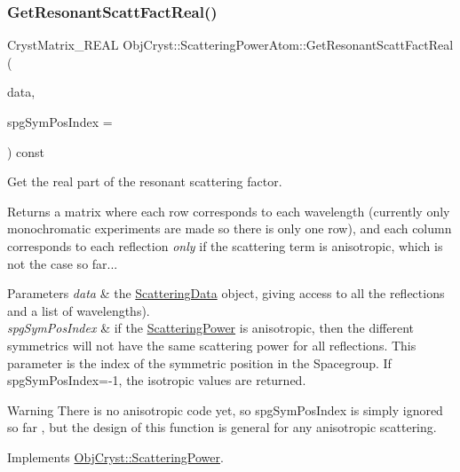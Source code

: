 \subsubsection{\texorpdfstring{GetResonantScattFactReal()}{GetResonantScattFactReal()}}
{\footnotesize\ttfamily Cryst\+Matrix\+\_\+\+R\+E\+AL Obj\+Cryst\+::\+Scattering\+Power\+Atom\+::\+Get\+Resonant\+Scatt\+Fact\+Real (\begin{DoxyParamCaption}\item[{const \mbox{\hyperlink{class_obj_cryst_1_1_scattering_data}{Scattering\+Data}} \&}]{data,  }\item[{const int}]{spg\+Sym\+Pos\+Index = {} }\end{DoxyParamCaption}) const\hspace{0.3cm}{\ttfamily [virtual]}}



Get the real part of the resonant scattering factor. 

\begin{DoxyReturn}{Returns}
a matrix where each row corresponds to each wavelength (currently only monochromatic experiments are made so there is only one row), and each column corresponds to each reflection {\itshape only} if the scattering term is anisotropic, which is not the case so far... 
\end{DoxyReturn}

\begin{DoxyParams}{Parameters}
{\em data} & the \mbox{\hyperlink{class_obj_cryst_1_1_scattering_data}{Scattering\+Data}} object, giving access to all the reflections and a list of wavelengths). \\
\hline
{\em spg\+Sym\+Pos\+Index} & if the \mbox{\hyperlink{class_obj_cryst_1_1_scattering_power}{Scattering\+Power}} is anisotropic, then the different symmetrics will not have the same scattering power for all reflections. This parameter is the index of the symmetric position in the Spacegroup. If spg\+Sym\+Pos\+Index=-\/1, the isotropic values are returned. \\
\hline
\end{DoxyParams}
\begin{DoxyWarning}{Warning}
There is no anisotropic code yet, so spg\+Sym\+Pos\+Index is simply ignored so far , but the design of this function is general for any anisotropic scattering. 
\end{DoxyWarning}


Implements \mbox{\hyperlink{class_obj_cryst_1_1_scattering_power_a42c1302254787d13b9e0f2210315291a}{Obj\+Cryst\+::\+Scattering\+Power}}.

